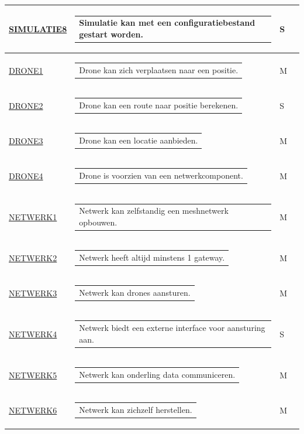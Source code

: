 \documentclass[a4paper, 11pt, oneside]{report}
\begin{document}
\begin{longtable}{|l|l|l|l|}
	\hyperlink{SIMULATIE8}{SIMULATIE8}			&\begin{tabular}[c]{@{}l@{}}Simulatie kan met een configuratiebestand gestart worden. \end{tabular}     &S \\ \hline	
	\hyperlink{DRONE1}{DRONE1}		&\begin{tabular}[c]{@{}l@{}}Drone kan zich verplaatsen naar een positie. \end{tabular}        			 &M \\ \hline	
	\hyperlink{DRONE2}{DRONE2}		&\begin{tabular}[c]{@{}l@{}}Drone kan een route naar positie berekenen.  \end{tabular}        			 &S \\ \hline	
	\hyperlink{DRONE3}{DRONE3}		&\begin{tabular}[c]{@{}l@{}}Drone kan een locatie aanbieden.  \end{tabular}        						 &M \\ \hline	
	\hyperlink{DRONE4}{DRONE4}		&\begin{tabular}[c]{@{}l@{}}Drone is voorzien van een netwerkcomponent.  \end{tabular}       &M \\ \hline	
	\hyperlink{NETWERK1}{NETWERK1}	&\begin{tabular}[c]{@{}l@{}}Netwerk kan zelfstandig een meshnetwerk opbouwen. \end{tabular}    			 &M \\ \hline	
	\hyperlink{NETWERK2}{NETWERK2}	&\begin{tabular}[c]{@{}l@{}}Netwerk heeft altijd minstens 1 gateway. 	\end{tabular}			 &M \\ \hline	
	\hyperlink{NETWERK3}{NETWERK3}	&\begin{tabular}[c]{@{}l@{}}Netwerk kan drones aansturen.						 \end{tabular}			 &M \\ \hline	
	\hyperlink{NETWERK4}{NETWERK4}	&\begin{tabular}[c]{@{}l@{}}Netwerk biedt een externe interface voor aansturing aan. \end{tabular}		 &S \\ \hline	
	\hyperlink{NETWERK5}{NETWERK5}	&\begin{tabular}[c]{@{}l@{}}Netwerk kan onderling data communiceren.	 \end{tabular}					 &M \\ \hline	
	\hyperlink{NETWERK6}{NETWERK6}	&\begin{tabular}[c]{@{}l@{}}Netwerk kan zichzelf herstellen. \end{tabular}			 					 &M \\ \hline	

\end{longtable}
\end{document}
